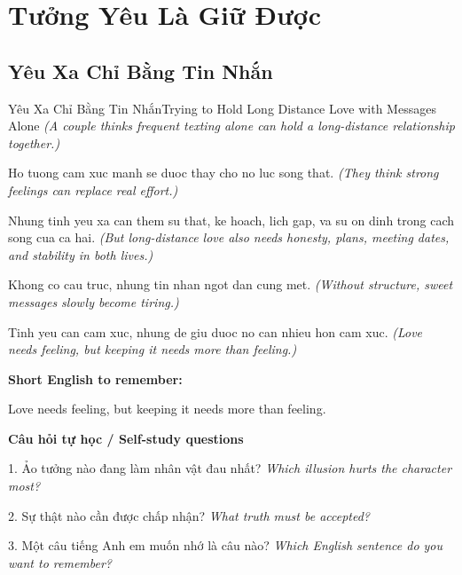 \chapter{Tưởng Yêu Là Giữ Được}

\section{Yêu Xa Chỉ Bằng Tin Nhắn}
\begin{truyen}{Yêu Xa Chỉ Bằng Tin Nhắn}{Trying to Hold Long Distance Love with Messages Alone}
\textit{(A couple thinks frequent texting alone can hold a long-distance relationship together.)}

Ho tuong cam xuc manh se duoc thay cho no luc song that.
\textit{(They think strong feelings can replace real effort.)}

Nhung tinh yeu xa can them su that, ke hoach, lich gap, va su on dinh trong cach song cua ca hai.
\textit{(But long-distance love also needs honesty, plans, meeting dates, and stability in both lives.)}

Khong co cau truc, nhung tin nhan ngot dan cung met.
\textit{(Without structure, sweet messages slowly become tiring.)}

\end{truyen}

\begin{baihoc}
Tinh yeu can cam xuc, nhung de giu duoc no can nhieu hon cam xuc.
\textit{(Love needs feeling, but keeping it needs more than feeling.)}
\end{baihoc}

\begin{ghinhoanh}
\textbf{Short English to remember:}

Love needs feeling, but keeping it needs more than feeling.

\end{ghinhoanh}

\begin{tuhocnhanh}
\textbf{Câu hỏi tự học / Self-study questions}

1. Ảo tưởng nào đang làm nhân vật đau nhất? \textit{Which illusion hurts the character most?}

2. Sự thật nào cần được chấp nhận? \textit{What truth must be accepted?}

3. Một câu tiếng Anh em muốn nhớ là câu nào? \textit{Which English sentence do you want to remember?}
\end{tuhocnhanh}
\ngancach

